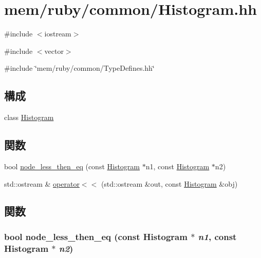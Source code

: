 \hypertarget{Histogram_8hh}{
\section{mem/ruby/common/Histogram.hh}
\label{Histogram_8hh}
}
{\ttfamily \#include $<$iostream$>$}\par
{\ttfamily \#include $<$vector$>$}\par
{\ttfamily \#include \char`\"{}mem/ruby/common/TypeDefines.hh\char`\"{}}\par
\subsection*{構成}
\begin{DoxyCompactItemize}
\item 
class \hyperlink{classHistogram}{Histogram}
\end{DoxyCompactItemize}
\subsection*{関数}
\begin{DoxyCompactItemize}
\item 
bool \hyperlink{Histogram_8hh_a5412781e11d47b0e6ccfa84353fe1baa}{node\_\-less\_\-then\_\-eq} (const \hyperlink{classHistogram}{Histogram} $\ast$n1, const \hyperlink{classHistogram}{Histogram} $\ast$n2)
\item 
std::ostream \& \hyperlink{Histogram_8hh_ae356c184f05019b81e5b392dd80e0e78}{operator$<$$<$} (std::ostream \&out, const \hyperlink{classHistogram}{Histogram} \&obj)
\end{DoxyCompactItemize}


\subsection{関数}
\hypertarget{Histogram_8hh_a5412781e11d47b0e6ccfa84353fe1baa}{
\subsubsection[{node\_\-less\_\-then\_\-eq}]{\setlength{\rightskip}{0pt plus 5cm}bool node\_\-less\_\-then\_\-eq (const {\bf Histogram} $\ast$ {\em n1}, \/  const {\bf Histogram} $\ast$ {\em n2})}}
\label{Histogram_8hh_a5412781e11d47b0e6ccfa84353fe1baa}



